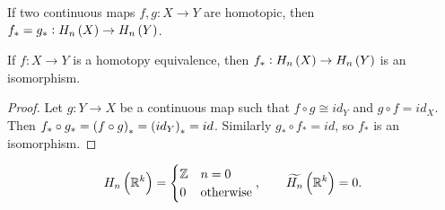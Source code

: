 \begin{theorem}
\label{thm:2.10}
If two continuous maps $ f, g : X \to Y $ are homotopic, then $ f_* = g_* : H_n\br{X} \to H_n\br{Y} $.
\end{theorem}

\begin{corollary}
If $ f : X \to Y $ is a homotopy equivalence, then $ f_* : H_n\br{X} \to H_n\br{Y} $ is an isomorphism.
\end{corollary}

\begin{proof}
Let $ g : Y \to X $ be a continuous map such that $ f \circ g \cong id_Y $ and $ g \circ f = id_X $. Then $ f_* \circ g_* = \br{f \circ g}_* = \br{id_Y}_* = id $. Similarly $ g_* \circ f_* = id $, so $ f_* $ is an isomorphism.
\end{proof}

\begin{example*}
$$ H_n\br{\R^k} =
\begin{cases}
\Z & n = 0 \\
0 & \text{otherwise}
\end{cases},
\qquad \widetilde{H_n}\br{\R^k} = 0.
$$
\end{example*}

\pagebreak


